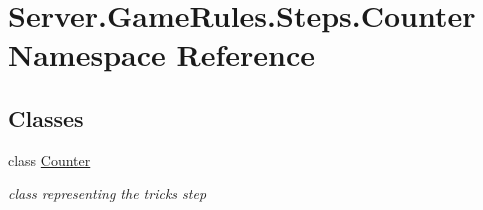 \hypertarget{namespace_server_1_1_game_rules_1_1_steps_1_1_counter}{}\section{Server.\+Game\+Rules.\+Steps.\+Counter Namespace Reference}
\label{namespace_server_1_1_game_rules_1_1_steps_1_1_counter}
\subsection*{Classes}
\begin{DoxyCompactItemize}
\item 
class \hyperlink{class_server_1_1_game_rules_1_1_steps_1_1_counter_1_1_counter}{Counter}
\begin{DoxyCompactList}\small\item\em class representing the tricks step \end{DoxyCompactList}\end{DoxyCompactItemize}

